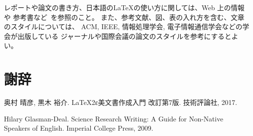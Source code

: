 \documentclass[a4paper,11pt]{jreport}
\begin{document}
レポートや論文の書き方、日本語の\LaTeX の使い方に関しては、Web 上の情報や
参考書など~\cite{Bibunsho,ScienceResearchWriting}を参照のこと。
また、参考文献、図、表の入れ方を含む、文章のスタイルについては、
ACM, IEEE, 情報処理学会, 電子情報通信学会などの学会が出版している
ジャーナルや国際会議の論文のスタイルを参考にするとよい。

\chapter*{謝辞}

\newpage

\renewcommand{\bibname}{参考文献}

%
%

\begin{thebibliography}{1}
奥村 晴彦, 黒木 裕介.
\newblock LaTeX2ε美文書作成入門 改訂第7版.
\newblock 技術評論社, 2017.

Hilary Glasman-Deal.
\newblock Science Research Writing: A Guide for Non-Native Speakers of English.
\newblock Imperial College Press, 2009.
\end{thebibliography}
\end{document}
